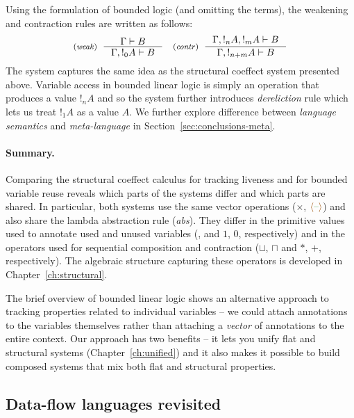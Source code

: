 Using the formulation of bounded logic (and omitting the terms), the weakening and
contraction rules are written as follows:
%
\[
\tyrule{weak}
  {\Gamma \vdash B}
  {\Gamma, !_0 A \vdash B}
\quad
\tyrule{contr}
  {\Gamma, !_n A, !_m A \vdash B}
  {\Gamma, !_{n+m} A \vdash B}
\]
%
The system captures the same idea as the structural coeffect system presented above.
Variable access in bounded linear logic is simply an operation that produces a value
$!_n A$ and so the system further introduces \emph{dereliction} rule which lets us 
treat $!_1 A$ as a value $A$. We further explore difference between \emph{language
semantics} and \emph{meta-language} in Section~\ref{sec:conclusions-meta}.

\paragraph{Summary.}
Comparing the structural coeffect calculus for tracking liveness and for bounded variable reuse
reveals which parts of the systems differ and which parts are shared. In particular, both systems
use the same vector operations ($\times$, $\alift{\cclrd{\textnormal{--}}}$) and also share the
lambda abstraction rule (\emph{abs}). They differ in the primitive values used to annotate used
and unused variables (,  and $1$, $0$, respectively) and in the operators used
for sequential composition and contraction ($\sqcup$, $\sqcap$ and $\ast$, $+$, respectively).
The algebraic structure capturing these operators is developed in Chapter~\ref{ch:structural}.

The brief overview of bounded linear logic shows an alternative approach to tracking properties
related to individual variables -- we could attach annotations to the variables themselves 
rather than attaching a \emph{vector} of annotations to the entire context. Our approach has
two benefits -- it lets you unify flat and structural systems (Chapter~\ref{ch:unified}) and 
it also makes it possible to build composed systems that mix both flat and structural properties.



\subsection{Data-flow languages revisited}

